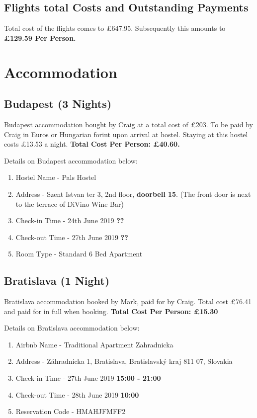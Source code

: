 \documentclass[a4paper,12pt]{article}
\begin{document}
      \subsection*{Flights total Costs and Outstanding Payments}
      Total cost of the flights comes to £647.95. Subsequently this amounts to \textbf{£129.59 Per Person.} \newline
  


\newpage

\section {Accommodation}
    \subsection*{Budapest (3 Nights)}
    Budapest accommodation bought by Craig at a total cost of £203. To be paid by Craig in Euros or Hungarian forint upon arrival at hostel.
     Staying at this hostel costs £13.53 a night. \textbf{Total Cost Per Person: £40.60.} \newline

    \noindent Details on Budapest accommodation below:

    \begin{enumerate}
      \item Hostel Name - Pals Hostel
      \item Address - Szent Istvan ter 3, 2nd floor, \textbf{doorbell 15}. (The front door is next to the terrace of DiVino Wine Bar)
      \item Check-in Time - 24th June 2019 \textbf{??}
      \item Check-out Time - 27th June 2019 \textbf{??}
      \item Room Type -  Standard 6 Bed Apartment
    \end{enumerate}
    
    \subsection*{Bratislava (1 Night)}
    Bratislava accommodation booked by Mark, paid for by Craig. Total cost £76.41 and paid for in full when booking. \textbf{Total Cost Per Person: £15.30}\newline
     
    \noindent Details on Bratislava accommodation below:
    
    \begin{enumerate}
    	\item Airbnb Name - Traditional Apartment Zahradnicka
    	\item Address - Záhradnícka 1, Bratislava, Bratislavský kraj 811 07, Slovakia
    	\item Check-in Time - 27th June 2019 \textbf{15:00 - 21:00}
    	\item Check-out Time - 28th June 2019 \textbf{10:00}
    	\item Reservation Code -  HMAHJFMFF2 \newline
    \end{enumerate}
\end{document}
